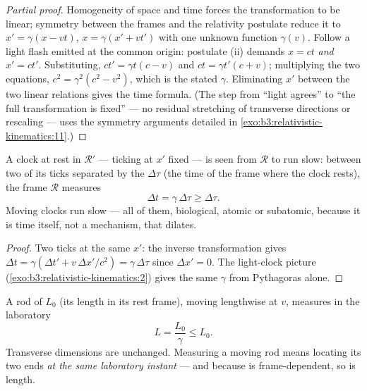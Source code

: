 \begin{proof}[Partial proof]
Homogeneity of space and time forces the transformation to be linear;
symmetry between the frames and the relativity postulate reduce it to
$x' = \gamma(x - vt)$, $x = \gamma(x' + vt')$ with one unknown
function $\gamma(v)$. Follow a light flash emitted at the common
origin: postulate (ii) demands $x = ct$ \emph{and} $x' = ct'$.
Substituting, $ct' = \gamma t(c - v)$ and $ct = \gamma t'(c + v)$;
multiplying the two equations, $c^2 = \gamma^2(c^2 - v^2)$, which is
the stated $\gamma$. Eliminating $x'$ between the two linear relations
gives the time formula. (The step from ``light agrees'' to ``the full
transformation is fixed'' --- no residual stretching of transverse
directions or rescaling --- uses the symmetry arguments detailed in
\cref{exo:b3:relativistic-kinematics:11}.)
\end{proof}

\begin{proposition}\label{prop:b3:relativistic-kinematics:dilation}
A clock at rest in $\mathcal R'$ --- ticking at $x'$ fixed --- is seen
from $\mathcal R$ to run slow: between two of its ticks separated by
the \emph{} $\Delta\tau$ (the time of the frame where the
clock rests), the frame $\mathcal R$ measures
\[
\Delta t = \gamma\,\Delta\tau \ge \Delta\tau .
\]
Moving clocks run slow --- all of them, biological, atomic or
subatomic, because it is time itself, not a mechanism, that dilates.
\end{proposition}

\begin{proof}
Two ticks at the same $x'$: the inverse transformation gives $\Delta t
= \gamma(\Delta t' + v\,\Delta x'/c^2) = \gamma\,\Delta\tau$ since
$\Delta x' = 0$. The light-clock picture
(\cref{exo:b3:relativistic-kinematics:2}) gives the same $\gamma$ from
Pythagoras alone.
\end{proof}

\begin{proposition}\label{prop:b3:relativistic-kinematics:contraction}
A rod of \emph{} $L_0$ (its length in its rest frame),
moving lengthwise at $v$, measures in the laboratory
\[
L = \frac{L_0}{\gamma} \le L_0 .
\]
Transverse dimensions are unchanged. Measuring a moving rod means
locating its two ends \emph{at the same laboratory instant} --- and
because  is frame-dependent, so is length.
\end{proposition}

